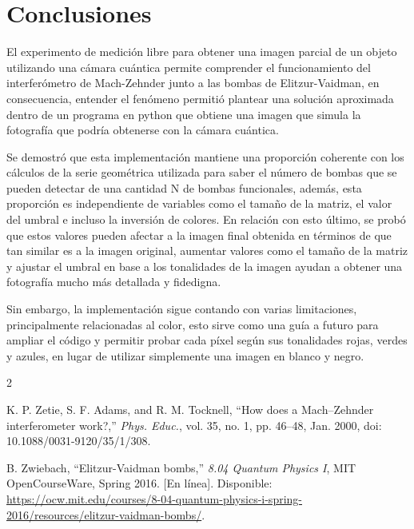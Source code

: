 \documentclass[conference]{IEEEtran}
\begin{document}
\section{Conclusiones}
El experimento de medición libre para obtener una imagen parcial de un objeto utilizando una cámara cuántica permite comprender el funcionamiento del interferómetro de Mach-Zehnder junto a las bombas de Elitzur-Vaidman, en consecuencia,
entender el fenómeno permitió plantear una solución aproximada dentro de un programa en python que obtiene una imagen que simula la fotografía que podría obtenerse con la cámara cuántica.

Se demostró que esta implementación mantiene una proporción coherente con los cálculos de la serie geométrica utilizada para saber el número de bombas que se pueden detectar de una cantidad N de bombas funcionales, además, esta proporción 
es independiente de variables como el tamaño de la matriz, el valor del umbral e incluso la inversión de colores. En relación con esto último, se probó que estos valores pueden afectar a la imagen final obtenida en términos de que tan similar 
es a la imagen original, aumentar valores como el tamaño de la matriz y ajustar el umbral en base a los tonalidades de la imagen ayudan a obtener una fotografía mucho más detallada y fidedigna.

Sin embargo, la implementación sigue contando con varias limitaciones, principalmente relacionadas al color, esto sirve como una guía a futuro para ampliar el código y permitir probar cada píxel según sus tonalidades rojas, verdes y azules, en lugar
de  utilizar simplemente una imagen en blanco y negro.

\begin{thebibliography}{2}

K. P. Zetie, S. F. Adams, and R. M. Tocknell, ``How does a Mach--Zehnder interferometer work?,'' \emph{Phys. Educ.}, vol. 35, no. 1, pp. 46--48, Jan. 2000, doi: 10.1088/0031-9120/35/1/308.

B. Zwiebach, ``Elitzur-Vaidman bombs,'' \emph{8.04 Quantum Physics I}, MIT OpenCourseWare, Spring 2016. [En línea]. Disponible: \url{https://ocw.mit.edu/courses/8-04-quantum-physics-i-spring-2016/resources/elitzur-vaidman-bombs/}.

\end{thebibliography}
\end{document}
